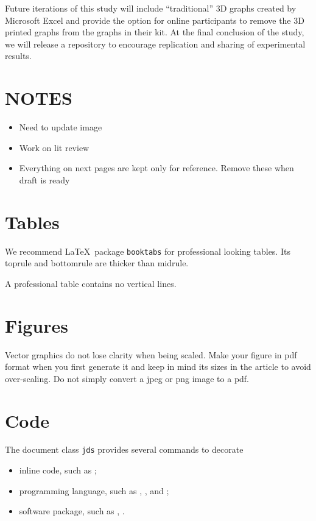 \documentclass[letterpaper,inpress]{jdsart}
\begin{document}
Future iterations of this study will include ``traditional'' 3D graphs created by Microsoft Excel and provide the option for online participants to remove the 3D printed graphs from the graphs in their kit. At the final conclusion of the study, we will release a repository to encourage replication and sharing of experimental results.

\newpage

\hypertarget{notes}{%
\section{NOTES}\label{notes}}

\begin{itemize}
\item
  Need to update image
\item
  Work on lit review
\item
  Everything on next pages are kept only for reference. Remove these when draft is ready
\end{itemize}

\newpage

\hypertarget{tables}{%
\section{Tables}\label{tables}}

We recommend \LaTeX~package \texttt{booktabs} for professional
looking tables. Its toprule and bottomrule are thicker than midrule.

A professional table contains no vertical lines.

\hypertarget{figures}{%
\section{Figures}\label{figures}}

Vector graphics do not lose clarity when being scaled. Make your
figure in pdf format when you first generate it and keep in mind its
sizes in the article to avoid over-scaling. Do not simply convert a
jpeg or png image to a pdf.

\hypertarget{code}{%
\section{Code}\label{code}}

The document class \texttt{jds} provides several commands to decorate

\begin{itemize}
\item inline code, such as ;
\item programming language, such as , , and
  ;
\item software package, such as , .
\end{itemize}
\end{document}
